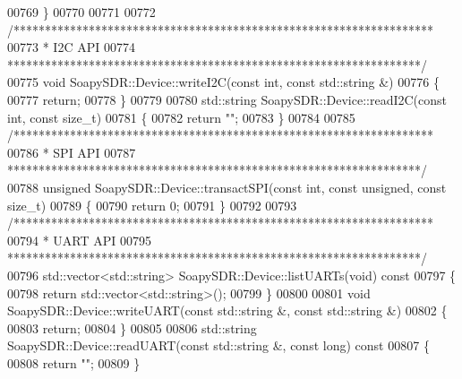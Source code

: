 \begin{DoxyCode}
00769 \}
00770 
00771 
00772 \textcolor{comment}{/*******************************************************************}
00773 \textcolor{comment}{ * I2C API}
00774 \textcolor{comment}{ ******************************************************************/}
00775 \textcolor{keywordtype}{void} SoapySDR::Device::writeI2C(\textcolor{keyword}{const} \textcolor{keywordtype}{int}, \textcolor{keyword}{const} std::string &)
00776 \{
00777     \textcolor{keywordflow}{return};
00778 \}
00779 
00780 std::string SoapySDR::Device::readI2C(\textcolor{keyword}{const} \textcolor{keywordtype}{int}, \textcolor{keyword}{const} \textcolor{keywordtype}{size\_t})
00781 \{
00782     \textcolor{keywordflow}{return} \textcolor{stringliteral}{""};
00783 \}
00784 
00785 \textcolor{comment}{/*******************************************************************}
00786 \textcolor{comment}{ * SPI API}
00787 \textcolor{comment}{ ******************************************************************/}
00788 \textcolor{keywordtype}{unsigned} SoapySDR::Device::transactSPI(\textcolor{keyword}{const} \textcolor{keywordtype}{int}, \textcolor{keyword}{const} \textcolor{keywordtype}{unsigned}, \textcolor{keyword}{const} \textcolor{keywordtype}{size\_t})
00789 \{
00790     \textcolor{keywordflow}{return} 0;
00791 \}
00792 
00793 \textcolor{comment}{/*******************************************************************}
00794 \textcolor{comment}{ * UART API}
00795 \textcolor{comment}{ ******************************************************************/}
00796 std::vector<std::string> SoapySDR::Device::listUARTs(\textcolor{keywordtype}{void})\textcolor{keyword}{ const}
00797 \textcolor{keyword}{}\{
00798     \textcolor{keywordflow}{return} std::vector<std::string>();
00799 \}
00800 
00801 \textcolor{keywordtype}{void} SoapySDR::Device::writeUART(\textcolor{keyword}{const} std::string &, \textcolor{keyword}{const} std::string &)
00802 \{
00803     \textcolor{keywordflow}{return};
00804 \}
00805 
00806 std::string SoapySDR::Device::readUART(\textcolor{keyword}{const} std::string &, \textcolor{keyword}{const} \textcolor{keywordtype}{long})\textcolor{keyword}{ const}
00807 \textcolor{keyword}{}\{
00808     \textcolor{keywordflow}{return} \textcolor{stringliteral}{""};
00809 \}
\end{DoxyCode}
